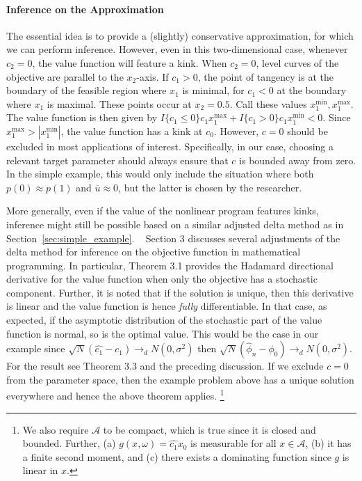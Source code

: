 \documentclass[12pt,a4paper,english]{article} %
\numberwithin{equation}{section}
\theoremstyle{definition}
\theoremstyle{remark}
\theoremstyle{plain}
\begin{document}
\paragraph{Inference on the Approximation}
The essential idea is to provide a (slightly) conservative approximation, for which we can perform inference.
However, even in this two-dimensional case, whenever $c_2=0$, the value function will feature a kink.
When $c_2=0$, level curves of the objective are parallel to the $x_2$-axis.
If $c_1 > 0$, the point of tangency is at the boundary of the feasible region where $x_1$ is minimal, for $c_1 < 0$ at the boundary where $x_1$ is maximal.
These points occur at $x_2=0.5$.
Call these values $x_1^{\min}, x_1^{\max}$.
The value function is then given by $I\{c_1 \leq 0\} c_1 x_1^{\max} + I\{c_1 > 0\} c_1 x_1^{\min} < 0$.
Since $x_1^{\max} > |x_1^{\min}|$, the value function has a kink at $c_0$.
However, $c = 0$ should be excluded in most applications of interest.
Specifically, in our case, choosing a relevant target parameter should always ensure that $c$ is bounded away from zero.
In the simple example, this would only include the situation where both $p(0) \approx p(1)$ and $\overline{u} \approx 0$, but the latter is chosen by the researcher.

More generally, even if the value of the nonlinear program features kinks, inference might still be possible based on a similar adjusted delta method as in Section~\ref{sec:simple_example}.
~\cite{shapiro1991asymptotic} Section 3 discusses several adjustments of the delta method for inference on the objective function in mathematical programming.
In particular, Theorem 3.1 provides the Hadamard directional derivative for the value function when only the objective has a stochastic component.
Further, it is noted that if the solution is unique, then this derivative is linear and the value function is hence \textit{fully} differentiable.
In that case, as expected, if the asymptotic distribution of the stochastic part of the value function is normal, so is the optimal value.
This would be the case in our example since $\sqrt{N}(\hat{c_1} - c_1) \to_d N(0,\sigma^2)$ then $\sqrt{N}(\hat{\phi}_n - \phi_0) \to_d N(0,\sigma^2)$.
For the result see Theorem 3.3 and the preceding discussion.
If we exclude $c=0$ from the parameter space, then the example problem above has a unique solution everywhere and hence the above theorem applies.
\footnote{We also require $\mathcal{A}$ to be compact, which is true since it is closed and bounded.
Further, (a) $g(x, \omega) = \hat{c_1}x_0$ is measurable for all $x \in \mathcal{A}$, (b) it has a finite second moment, and (c) there exists a dominating function since $g$ is linear in $x$.}
\end{document}
